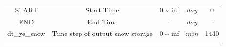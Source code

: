 \documentclass[]{scrbook}
\begin{document}
\begin{longtable}[]{@{}ccccc@{}}
\begin{minipage}[t]{0.17\columnwidth}\centering\strut
START\strut
\end{minipage} & \begin{minipage}[t]{0.23\columnwidth}\centering\strut
Start Time\strut
\end{minipage} & \begin{minipage}[t]{0.10\columnwidth}\centering\strut
0 \textasciitilde{} inf\strut
\end{minipage} & \begin{minipage}[t]{0.10\columnwidth}\centering\strut
\(day\)\strut
\end{minipage} & \begin{minipage}[t]{0.26\columnwidth}\centering\strut
0\strut
\end{minipage}\tabularnewline
\begin{minipage}[t]{0.17\columnwidth}\centering\strut
END\strut
\end{minipage} & \begin{minipage}[t]{0.23\columnwidth}\centering\strut
End Time\strut
\end{minipage} & \begin{minipage}[t]{0.10\columnwidth}\centering\strut
-\strut
\end{minipage} & \begin{minipage}[t]{0.10\columnwidth}\centering\strut
\(day\)\strut
\end{minipage} & \begin{minipage}[t]{0.26\columnwidth}\centering\strut
-\strut
\end{minipage}\tabularnewline
\begin{minipage}[t]{0.17\columnwidth}\centering\strut
dt\_ye\_snow\strut
\end{minipage} & \begin{minipage}[t]{0.23\columnwidth}\centering\strut
Time step of output snow storage\strut
\end{minipage} & \begin{minipage}[t]{0.10\columnwidth}\centering\strut
0 \textasciitilde{} inf\strut
\end{minipage} & \begin{minipage}[t]{0.10\columnwidth}\centering\strut
\(min\)\strut
\end{minipage} & \begin{minipage}[t]{0.26\columnwidth}\centering\strut
1440\strut
\end{minipage}\tabularnewline
\begin{minipage}[t]{0.17\columnwidth}\centering\strut

\end{minipage}
\end{longtable}
\end{document}
